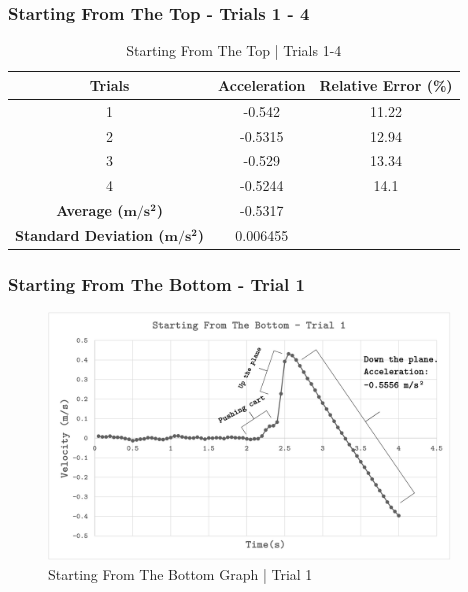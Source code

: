 \subsubsection{Starting From The Top - Trials 1 - 4}

\begin{table}[H]
\centering
\begin{tabular}{@{}ccc@{}}
\toprule
\textbf{Trials} & \textbf{Acceleration} & \textbf{Relative Error (\%)} \\ \midrule
1 & -0.542 & 11.22 \\
2 & -0.5315 & 12.94 \\
3 & -0.529 & 13.34 \\
4 & -0.5244 & 14.1 \\ \midrule
\textbf{Average ($\boldsymbol{m/s^2}$)} & -0.5317 &  \\
\textbf{Standard Deviation ($\boldsymbol{m/s^2}$)} & 0.006455 &  \\ \bottomrule
\end{tabular}
\caption{Starting From The Top | Trials 1-4 }
\label{tab:ip-sftt}
\end{table}

\subsubsection{Starting From The Bottom - Trial 1}
\begin{figure}[H]
	\begin{center}
		\includegraphics[width=0.95\textwidth]{cartg2.png}
	\end{center}
	\caption{Starting From The Bottom Graph | Trial 1}
	\label{fig:cartg2}
\end{figure} 


